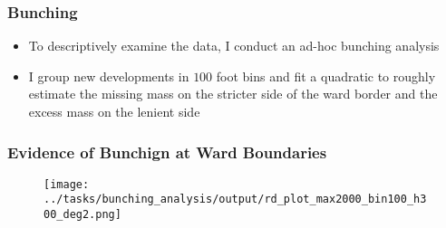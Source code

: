\begin{frame}
    \frametitle{Bunching} 
            \begin{itemize} 
                \item To descriptively examine the data, I conduct an ad-hoc bunching analysis \\ {\scriptsize \cite{saez_taxpayers_2010,kleven_bunching_2016,brueckner_bunching_2024}}
                \item I group new developments in $100$ foot bins and fit a quadratic to roughly estimate the missing mass on the stricter side of the ward border and the excess mass on the lenient side
            \end{itemize}
\end{frame}


\begin{frame}[t,label=bunching_hist]
    \frametitle{Evidence of Bunchign at Ward Boundaries}
        \begin{figure}
            \centering
            \texttt{[image: ../tasks/bunching\_analysis/output/rd\_plot\_max2000\_bin100\_h300\_deg2.png]}
            \label{fig:bunching_hist}
        \end{figure}
 \end{frame} 




